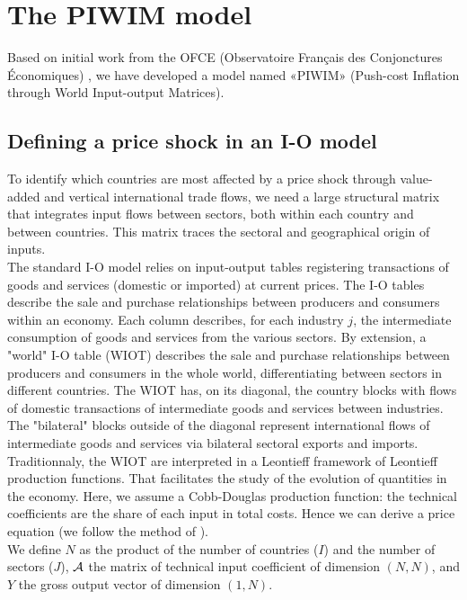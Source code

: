 \documentclass[11pt,a4paper]{article}
\begin{document}
\section{The PIWIM model }
\label{sec:metho}

Based on initial work from the OFCE (Observatoire Français des Conjonctures Économiques) \cite{Cochard2016}, we have developed a model named «PIWIM» (Push-cost Inflation through World Input-output Matrices). 

\subsection{Defining a price shock in an I-O model}\label{subsec:ioprice}
To identify which countries are most affected by a price shock through value-added and vertical international trade flows, we need a large structural matrix that integrates input flows between sectors, both within each country and between countries.
This matrix traces the sectoral and geographical origin of inputs. \\
The standard I-O model relies on input-output tables registering transactions of goods and services (domestic or imported) at current prices. The I-O tables describe the sale and purchase relationships between producers and consumers within an economy. Each column describes, for each industry $j$, the intermediate consumption of goods and services from the various sectors.
By extension, a "world" I-O table (WIOT) describes the sale and purchase relationships between producers and consumers in the whole world, differentiating between sectors in different countries.
The WIOT has, on its diagonal, the country blocks with flows of domestic transactions of intermediate goods and services between industries.
The "bilateral" blocks outside of the diagonal represent international flows of intermediate goods and services via bilateral sectoral exports and imports. \\
Traditionnaly, the WIOT are interpreted in a Leontieff framework of Leontieff production functions. That facilitates the study of the evolution of quantities in the economy. Here, we assume a Cobb-Douglas production function: the technical coefficients are the share of each input in total costs. Hence we can derive a price equation (we follow the method of \citep{DeSoyres2018}).\\
We define $N$ as the product of the number of countries ($I$) and the number of sectors ($J$), $\cal A$ the matrix of technical input coefficient of dimension $(N, N)$, and $Y$ the gross output vector of dimension $(1, N)$. \\
\end{document}
